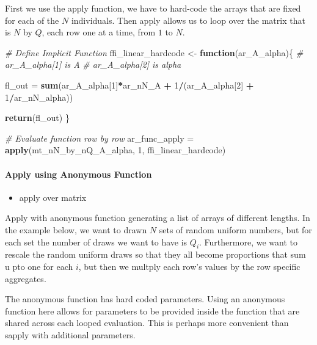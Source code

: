 \documentclass[
]{book}
\newenvironment{Shaded}{\begin{snugshade}}{\end{snugshade}}
\newcommand{\CommentTok}[1]{\textcolor[rgb]{0.56,0.35,0.01}{\textit{#1}}}
\newcommand{\ControlFlowTok}[1]{\textcolor[rgb]{0.13,0.29,0.53}{\textbf{#1}}}
\newcommand{\DecValTok}[1]{\textcolor[rgb]{0.00,0.00,0.81}{#1}}
\newcommand{\KeywordTok}[1]{\textcolor[rgb]{0.13,0.29,0.53}{\textbf{#1}}}
\newcommand{\NormalTok}[1]{#1}
\newcommand{\OperatorTok}[1]{\textcolor[rgb]{0.81,0.36,0.00}{\textbf{#1}}}
\newcommand{\StringTok}[1]{\textcolor[rgb]{0.31,0.60,0.02}{#1}}
\providecommand{\tightlist}{%
  \setlength{\itemsep}{0pt}\setlength{\parskip}{0pt}}
\begin{document}
First we use the apply function, we have to hard-code the arrays that are fixed for each of the \(N\) individuals. Then apply allows us to loop over the matrix that is \(N\) by \(Q\), each row one at a time, from \(1\) to \(N\).

\begin{Shaded}
\begin{Highlighting}[]
\CommentTok{# Define Implicit Function}
\NormalTok{ffi_linear_hardcode <-}\StringTok{ }\ControlFlowTok{function}\NormalTok{(ar_A_alpha)\{}
  \CommentTok{# ar_A_alpha[1] is A}
  \CommentTok{# ar_A_alpha[2] is alpha}

\NormalTok{  fl_out =}\StringTok{ }\KeywordTok{sum}\NormalTok{(ar_A_alpha[}\DecValTok{1}\NormalTok{]}\OperatorTok{*}\NormalTok{ar_nN_A }\OperatorTok{+}
\StringTok{                 }\DecValTok{1}\OperatorTok{/}\NormalTok{(ar_A_alpha[}\DecValTok{2}\NormalTok{] }\OperatorTok{+}\StringTok{ }\DecValTok{1}\OperatorTok{/}\NormalTok{ar_nN_alpha))}

  \KeywordTok{return}\NormalTok{(fl_out)}
\NormalTok{\}}

\CommentTok{# Evaluate function row by row}
\NormalTok{ar_func_apply =}\StringTok{ }\KeywordTok{apply}\NormalTok{(mt_nN_by_nQ_A_alpha, }\DecValTok{1}\NormalTok{, ffi_linear_hardcode)}
\end{Highlighting}
\end{Shaded}

\hypertarget{apply-using-anonymous-function}{%
\paragraph{Apply using Anonymous Function}\label{apply-using-anonymous-function}}

\begin{itemize}
\tightlist
\item
  apply over matrix
\end{itemize}

Apply with anonymous function generating a list of arrays of different lengths. In the example below, we want to drawn \(N\) sets of random uniform numbers, but for each set the number of draws we want to have is \(Q_i\). Furthermore, we want to rescale the random uniform draws so that they all become proportions that sum u pto one for each \(i\), but then we multply each row's values by the row specific aggregates.

The anonymous function has hard coded parameters. Using an anonymous function here allows for parameters to be provided inside the function that are shared across each looped evaluation. This is perhaps more convenient than sapply with additional parameters.
\end{document}
